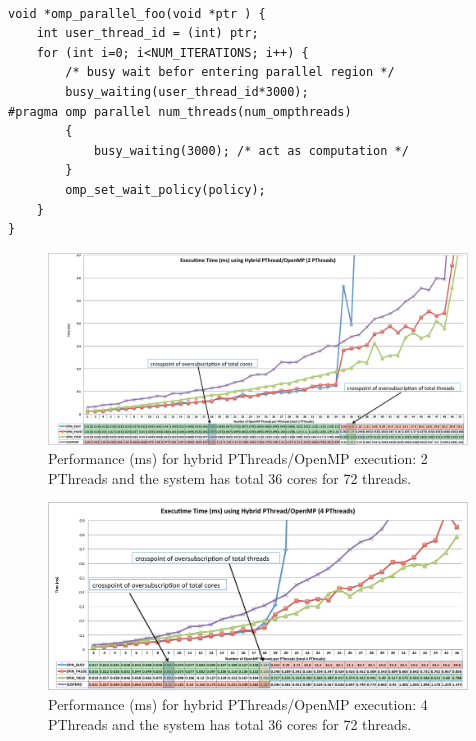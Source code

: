 \lstset{basicstyle=\sffamily\footnotesize,language=c, numbersep=1pt}
\begin{lstlisting}[frame=single]  % Start your code-block

void *omp_parallel_foo(void *ptr ) {   
    int user_thread_id = (int) ptr;
    for (int i=0; i<NUM_ITERATIONS; i++) {
        /* busy wait befor entering parallel region */
        busy_waiting(user_thread_id*3000);
#pragma omp parallel num_threads(num_ompthreads)
        {   
            busy_waiting(3000); /* act as computation */
        }
        omp_set_wait_policy(policy);
    }
}

\end{lstlisting}


\begin{figure}[h]
    \includegraphics[width=0.99\textwidth] {images/2PThread_performance}
    \caption{Performance (ms) for hybrid PThreads/OpenMP execution: 2 PThreads and the system has total 36 cores for 72 threads.}
    \label{fig:2PThread_performance}
\end{figure}

\begin{figure}[h]
    \includegraphics[width=0.99\textwidth] {images/4PThread_performance}
    \caption{Performance (ms) for hybrid PThreads/OpenMP execution: 4 PThreads and the system has total 36 cores for 72 threads.}
    \label{fig:4PThread_performance}
\end{figure}

